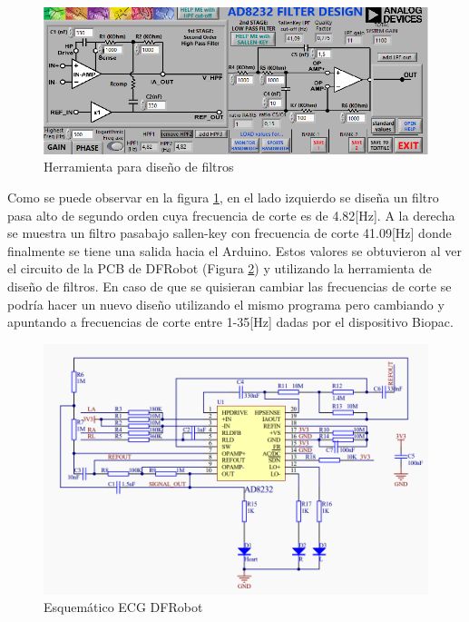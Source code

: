 \begin{figure}[H]
\centering
\includegraphics[scale=0.6]{figuras/ecg/ecgdesign.png}
\caption{Herramienta para diseño de filtros}
\label{ecgdesign}
\end{figure}

Como se puede observar en la figura \ref{ecgdesign}, en el lado izquierdo se diseña un filtro pasa alto de segundo orden cuya frecuencia de corte es de 4.82[Hz]. A la derecha se muestra un filtro pasabajo sallen-key con frecuencia de corte 41.09[Hz] donde finalmente se tiene una salida hacia el Arduino. 
Estos valores se obtuvieron al ver el circuito de la PCB de DFRobot (Figura \ref{esquematico11}) y utilizando la herramienta de diseño de filtros. En caso de que se quisieran cambiar las frecuencias de corte se podría hacer un nuevo diseño utilizando el mismo programa pero cambiando y apuntando a frecuencias de corte entre 1-35[Hz] dadas por el dispositivo Biopac.

\begin{figure}[H]
\centering
\includegraphics[scale=0.45]{figuras/ecg/esquematico.png}
\caption{Esquemático ECG DFRobot}
\label{esquematico11}
\end{figure}

